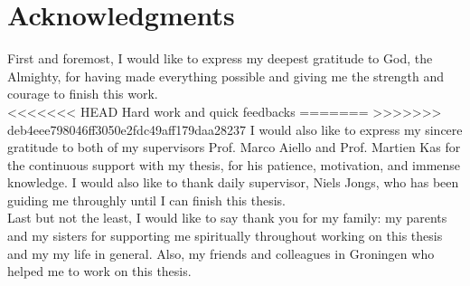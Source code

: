 
\begingroup
\let\clearpage\relax
\let\cleardoublepage\relax
\let\cleardoublepage\relax
\chapter*{Acknowledgments}
First and foremost, I would like to express my deepest gratitude to God, the Almighty, for having made everything possible and giving me the strength and courage to finish this work.\\

\noindent
<<<<<<< HEAD
Hard work and quick feedbacks
=======
>>>>>>> deb4eee798046ff3050e2fdc49aff179daa28237
I would also like to express my sincere gratitude to both of my supervisors Prof. Marco Aiello and Prof. Martien Kas for the continuous support with my thesis, for his patience, motivation, and immense knowledge. I would also like to thank daily supervisor, Niels Jongs, who has been guiding me throughly until I can finish this thesis.\\

\noindent
Last but not the least, I would like to say thank you for my family: my parents and my sisters for supporting me spiritually throughout working on this thesis and my my life in general. Also, my friends and colleagues in Groningen who helped me to work on this thesis.
\endgroup



